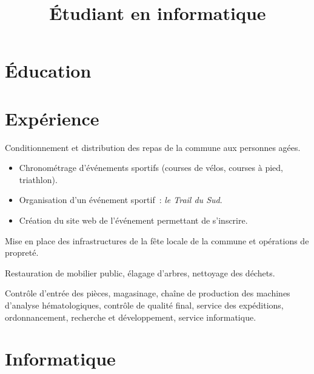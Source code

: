 \documentclass[11pt,a4paper,sans]{moderncv}
\title{Étudiant en informatique}
\begin{document}
\makecvtitle


\section{Éducation}




\section{Expérience}

%
{Conditionnement et distribution des repas de la commune aux personnes agées.}

%
{\begin{itemize}
    \item Chronométrage d'événements sportifs (courses de vélos, courses à pied, triathlon).
    \item Organisation d'un événement sportif~: \emph{le Trail du Sud}.
    \item Création du site web de l'événement permettant de s'inscrire.
\end{itemize}}

%
{Mise en place des infrastructures de la fête locale de la commune et opérations de propreté.}

%
{Restauration de mobilier public, élagage d'arbres, nettoyage des déchets.}

%
{Contrôle d'entrée des pièces, magasinage, chaîne de production des machines d'analyse hématologiques, contrôle de qualité final, service des expéditions, ordonnancement, recherche et développement, service informatique.}


\section{Informatique}
\end{document}
